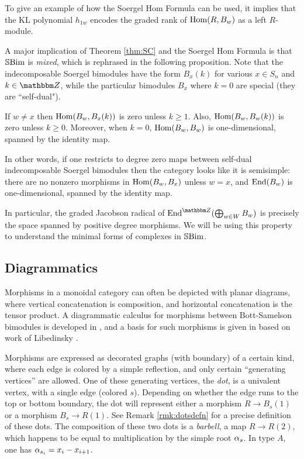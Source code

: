 To give an example of how the Soergel Hom Formula can be used, it implies that the KL polynomial $h_{1w}$ encodes the graded rank of $\operatorname{Hom}(R,B_w)$ as a left $R$-module.

A major implication of Theorem \ref{thm:SC} and the Soergel Hom Formula is that ${\mathbb{S}}{\rm Bim }$ is \emph{mixed}, which is rephrased in the following proposition. Note that the indecomposable
Soergel bimodules have the form $B_x(k)$ for various $x \in S_n$ and $k \in \Z$, while the particular bimodules $B_x$ where $k=0$ are special (they are ``self-dual").

\begin{prop} \label{prop:soergelmixed} If $w \ne x$ then $\operatorname{Hom}(B_w, B_x(k))$ is zero unless $k \ge 1$. Also, $\operatorname{Hom}(B_w,B_w(k))$ is zero unless $k \ge 0$. Moreover, when $k=0$,
$\operatorname{Hom}(B_w,B_w)$ is one-dimensional, spanned by the identity map. \end{prop}

In other words, if one restricts to degree zero maps between self-dual indecomposable Soergel bimodules then the category looks like it is semisimple: there are no nonzero morphisms in
$\operatorname{Hom}(B_w, B_x)$ unless $w=x$, and $\operatorname{End}(B_w)$ is one-dimensional, spanned by the identity map.

In particular, the graded Jacobson radical of $\Endg(\bigoplus_{w \in W} B_w)$ is precisely the space spanned by positive degree morphisms. We will be using this property to understand
the minimal forms of complexes in ${\mathbb{S}}{\rm Bim }$.

\subsection{Diagrammatics}
\label{subsec:diagram1}

Morphisms in a monoidal category can often be depicted with planar diagrams, where vertical concatenation is composition, and horizontal concatenation is the tensor product. A
diagrammatic calculus for morphisms between Bott-Samelson bimodules is developed in \cite{EKho, ECathedral, EWsoergelCalc}, and a basis for such morphisms is given in
\cite{EWsoergelCalc} based on work of Libedinsky \cite{LibLL}.

Morphisms are expressed as decorated graphs (with boundary) of a certain kind, where each edge is colored by a simple reflection, and only certain ``generating vertices'' are allowed.
One of these generating vertices, the \emph{dot}, is a univalent vertex, with a single edge (colored $s$). Depending on whether the edge runs to the top or bottom boundary, the dot will
represent either a morphism $R \to B_s(1)$ or a morphism $B_s \to R(1)$. See Remark \ref{rmk:dotsdefn} for a precise definition of these dots. The composition of these two dots is a
\emph{barbell}, a map $R \to R(2)$, which happens to be equal to multiplication by the simple root $\alpha_s$. In type $A$, one has $\alpha_{s_i} = x_i - x_{i+1}$.

